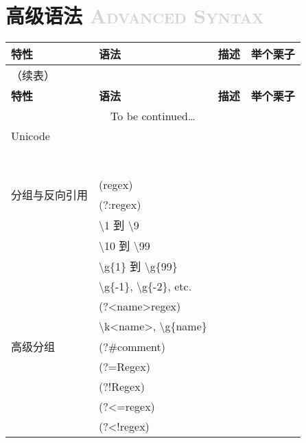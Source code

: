 \documentclass[12pt,a4paper,twoside]{ctexart}
\begin{document}
\section[高级语法]{高级语法 \textcolor{lightgray}{\textsc{Advanced Syntax}}}
\label{sec:adv-syntax}

\begin{center}

\begin{longtable}{p{4em}p{9em}p{28em}p{15em}}
  \toprule
  \textbf{特性} & \textbf{语法} & \textbf{描述} & \textbf{举个栗子} \\
  \midrule
  \endfirsthead                 %
  \multicolumn{4}{l}{（续表）} \\
  \toprule
  \textbf{特性} & \textbf{语法} & \textbf{描述} & \textbf{举个栗子} \\
  \midrule
  \endhead                      %
  \midrule
  \multicolumn{4}{c}{To be continued\ldots} \\[2ex]
  \endfoot                      %
  \bottomrule
  \endlastfoot                  %
  Unicode & & & \\
  & & & \\
  & & & \\
  & & & \\
  & & & \\
  & & & \\
  & & & \\
  & & & \\
  \midrule
  \multirow{2}{4em}{分组与反向引用} & (regex) & & \\
  & (?:regex) & & \\
  & \textbackslash{}1 到 \textbackslash{}9 & & \\
  & \textbackslash{}10 到 \textbackslash{}99 & & \\
  & \textbackslash{}g\{1\} 到 \textbackslash{}g\{99\} & & \\
  & \textbackslash{}g\{-1\}, \textbackslash{}g\{-2\}, etc. & & \\
  & (?<name>regex) & & \\
  & \textbackslash{}k<name>, \textbackslash{}g\{name\} & & \\
  \midrule
  高级分组 & (?\#comment) & & \\
  & (?=Regex) & & \\
  & (?!Regex) & & \\
  & (?<=regex) & & \\
  & (?<!regex) & & \\
\end{longtable}

\end{center}
\end{document}
